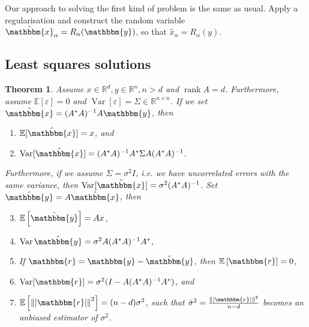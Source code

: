 \documentclass[12pt]{article}
\newtheorem{theorem}{Theorem}[section]
\theoremstyle{definition}
\newcommand{\real}{\mathbb{R}}   %
\newcommand{\abs}[1]{\left|#1\right|}
\DeclareMathOperator{\var}{Var}
\DeclareMathOperator{\rank}{rank}
\newcommand{\E}[1]{\mathbb{E} \left[#1\right]}
\newcommand\norm[1]{\left\lVert#1\right\rVert}
\begin{document}
Our approach to solving the first kind of problem is the same as usual. Apply a regularisation and construct the random variable $\hat{\mathbbm{x}}_\alpha = R_\alpha(\mathbbm{y})$, so that $\hat{x}_\alpha = R_\alpha(y)$. 

\subsection{Least squares solutions}

\begin{theorem}
    Assume $x\in\real^d, y\in\real^n, n> d$ and $\rank A = d$. Furthermore, assume $\mathbb{E}[\varepsilon]=0$ and $\var[\varepsilon] = \Sigma \in \real^{n\times n}$. If we set $\hat{\mathbbm{x}} = (A^*A)^{-1} A \mathbbm{y}$, then
    \begin{enumerate}[label=(\alph*)]
        \item $\mathbb{E}[\hat{\mathbbm{x}}]=x$, and
        \item $\var[\hat{\mathbbm{x}}]= (A^*A)^{-1}A^*\Sigma A(A^*A)^{-1}$.
    \end{enumerate}
    Furthermore, if we assume $\Sigma = \sigma^2 I$, i.e. we have uncorrelated errors with the same variance, then $\var[\hat{\mathbbm{x}}]= \sigma^2 (A^*A)^{-1}$. Set $\hat{\mathbbm{y}} = A \hat{\mathbbm{x}}$, then 
    \begin{enumerate}[label=(\alph*)]
        \setcounter{enumi}{2}
        \item $\E{\hat{\mathbbm{y}}} = Ax$,
        \item $\var \hat{\mathbbm{y}} = \sigma^2 A(A^*A)^{-1}A^*$,
        \item If $\mathbbm{r} = \mathbbm{y} - \hat{\mathbbm{y}}$, then $\E{\mathbbm{r}} = 0$,
        \item $\var[\mathbbm{r}] = \sigma^2(I - A(A^*A)^{-1}A^*)$, and
        \item $\E{\norm{ \abs{\mathbbm{r}}}^2} = (n-d) \sigma^2$, such that $\hat{\mathbb{\sigma}}^2 = \frac{\norm{ \abs{\mathbbm{r}}}^2}{n-d}$ becomes an unbiased estimator of $\sigma^2$.
    \end{enumerate}
\end{theorem}
\end{document}
